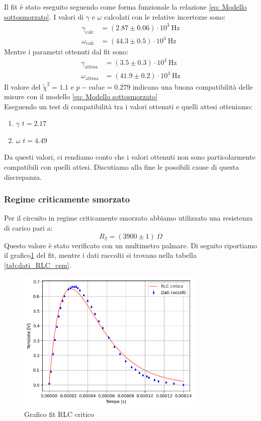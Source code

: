 \documentclass[letterpaper,12pt]{article}
\begin{document}
Il fit è stato eseguito seguendo come forma funzionale la relazione \eqref{eq: Modello sottosmorzato}.
I valori di $\gamma$ e $\omega$ calcolati con le relative incertezze sono:
\begin{align*}
    \gamma_\text{calc} & = (2.87 \pm 0.06) \cdot 10^3\ \text{Hz} \\
    \omega_\text{calc} & = (44.3 \pm 0.5) \cdot 10^3\ \text{Hz}
\end{align*}
Mentre i parametri ottenuti dal fit sono:
\begin{align*}
    \gamma_\text{attesa} & = (3.5 \pm 0.3) \cdot 10^3\ \text{Hz} \\
    \omega_\text{attesa} & = (41.9 \pm 0.2) \cdot 10^3\ \text{Hz}
\end{align*}
Il valore del $\widetilde{\chi}^2 = 1.1$ e $p-value = 0.279$ indicano una buona compatibilità delle misure con il modello \ref{eq: Modello sottosmorzato}\\
Eseguendo un test di compatibilità tra i valori ottenuti e quelli attesi otteniamo:
\begin{enumerate}
    \item $\gamma$ \quad  $t = 2.17$
    \item $\omega$ \quad $t = 4.49$
\end{enumerate}
Da questi valori, ci rendiamo conto che i valori ottenuti non sono particolarmente compatibili con quelli attesi. 
Discutiamo alla fine le possibili cause di questa discrepanza. \\


\subsubsection{Regime criticamente smorzato}
Per il circuito in regime  criticamente smorzato abbiamo utilizzato una resistenza di carico pari a: $$R_2 =(3900\pm1)\ \Omega $$
Questo valore è stato verificato con un multimetro palmare. Di seguito riportiamo il grafico\ref{fig:fitRLCcritic} del fit, mentre i dati raccolti si trovano nella tabella \ref{tab:dati_RLC_csm}. 
\begin{figure}[h!] 
  \centering
  \includegraphics[width=0.8\textwidth]{RLCcritic.png} %
  \caption{Grafico fit RLC critico}
  \label{fig:fitRLCcritic}
\end{figure}
\end{document}
